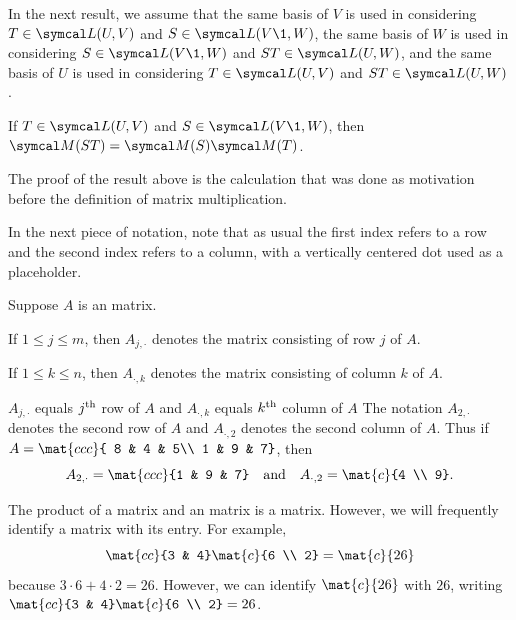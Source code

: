 In the next result, we assume that the same basis of $V$ is used in considering $T \in \L(U, V)$ and $S \in \L(V\1, W)$, the same basis of $W$ is used in considering $S \in \L(V\1, W)$ and $ST \in \L(U,W)$, and the same basis of $U$ is used in considering $T \in \L(U, V)$ and $ST \in \L(U, W)$.

{If $T \in \L(U, V)$ and $S \in \L(V\1, W)$, then $\M(ST) = \M(S) \M(T)$.}

The proof of the result above is the calculation that was done as motivation before the definition of matrix multiplication.

In the next piece of notation, note that as usual the first index refers to a row and the second index refers to a column, with a vertically centered dot used as a placeholder.

{\label{Ajk}
Suppose $A$ is an  matrix.
\begin{Itemize}
\item
If $1 \le j \le m$, then $A_{j, \cdot}$ denotes the  matrix consisting of row $j$ of $A$.
\item
If $1 \le k \le n$, then $A_{\cdot, k}$ denotes the  matrix consisting of column $k$ of $A$.
\end{Itemize}}

\begin{example}{$A_{j,\cdot}$ equals\/ $j^{\text{{th}}}$ row of\/ $A$ and $A_{\cdot, k}$ equals\/ $k^{\text{{th}}}$ column of\/ $A$}
The notation $A_{2,\cdot}$ denotes the second row of $A$ and $A_{\cdot, 2} $ denotes the second column of $A$.
Thus if $A = \mat{ccc}{ 8 & 4 & 5\\ 1 & 9 & 7}$, then
\[
A_{2,\cdot} = \mat{ccc}{1 & 9 & 7} \andd
A_{\cdot, 2} = \mat{c}{4 \\ 9}.
\]
\vspace{-.2in}
\end{example}

The product of a  matrix and an  matrix is a  matrix. However, we will frequently identify a  matrix with its entry.
For example,
\[
\mat{cc}{3 & 4} \mat{c}{6 \\ 2} = \mat{c}{26}
\]
because $3 \cdot 6 + 4 \cdot 2 = 26$. However, we can identify $\mat{c}{26}$ with $26$, writing $\mat{cc}{3 & 4} \mat{c}{6 \\ 2} = 26$.

